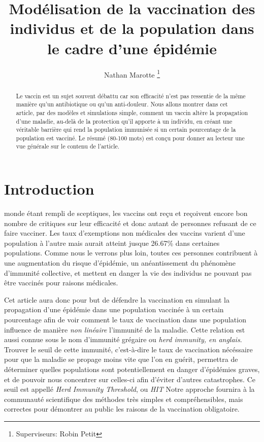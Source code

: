 \documentclass[journal, a4paper]{IEEEtran}
\begin{document}
	\title{Modélisation de la vaccination des individus et de la population dans le cadre d'une épidémie}
	\author{Nathan Marotte
	\thanks{Superviseurs: Robin Petit}}
	\maketitle

\begin{abstract}
	Le vaccin est un sujet souvent débattu car son efficacité n'est pas ressentie de la même manière qu'un antibiotique ou qu'un anti-douleur. Nous allons montrer dans cet article, par des modèles et simulations simple, comment un vaccin altère la propagation d'une maladie, au-delà de la protection qu'il apporte à un individu, en créant une véritable barrière qui rend la population immunisée si un certain pourcentage de la population est vacciné.
	Le résumé (80-100 mots) est conçu pour donner au lecteur une vue générale sur le contenu de l'article.
\end{abstract}

\section{Introduction}
	 monde étant rempli de sceptiques, les vaccins ont reçu et reçoivent encore bon nombre de critiques sur leur efficacité et donc autant de personnes refusant de ce faire vacciner. Les taux d'exemptions non médicales des vaccins varient d'une population à l'autre mais aurait atteint jusque 26.67\% \cite{NME_vaccine} dans certaines populations. Comme nous le verrons plus loin, toutes ces personnes contribuent à une augmentation du risque d'épidémie, un anéantissement du phénomène d'immunité collective, et mettent en danger la vie des individus ne pouvant pas être vaccinés pour raisons médicales.\

	Cet article aura donc pour but de défendre la vaccination en simulant la propagation d'une épidémie dans une population vaccinée à un certain pourcentage afin de voir comment le taux de vaccination dans une population influence de manière \emph{non linéaire} l'immunité de la maladie. Cette relation est aussi connue sous le nom d'immunité grégaire ou \emph{herd immunity, en anglais}.
	Trouver le seuil de cette immunité, c'est-à-dire le taux de vaccination nécéssaire pour que la maladie se propage moins vite que l'on en guérit, permettra de déterminer quelles populations sont potentiellement en danger d'épidémies graves, et de pouvoir nous concentrer sur celles-ci afin d'éviter d'autres catastrophes. Ce seuil est appellé \emph{Herd Immunity Threshold}, ou \emph{HIT}
	Notre approche fournira à la communauté scientifique des méthodes très simples et compréhensibles, mais correctes pour démontrer au public les raisons de la vaccination obligatoire.
\end{document}
